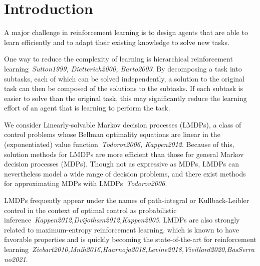 \section{Introduction}
A major challenge in reinforcement learning is to design agents that are able to learn efficiently and to adapt their existing knowledge to solve new tasks.

One way to reduce the complexity of learning is hierarchical reinforcement learning~\textit{Sutton1999, Dietterich2000, Barto2003}. By decomposing a task into subtasks, each of which can be solved independently, a solution to the original task can then be composed of the solutions to the subtasks. If each subtask is easier to solve than the original task, this may significantly reduce the learning effort of an agent that is learning to perform the task.

We consider Linearly-solvable Markov decision processes (LMDPs), a class of control problems %
whose Bellman optimality equations are linear in the (exponentiated) value function~\textit{Todorov2006, Kappen2012}. Because of this, solution methods for LMDPs are more efficient than those for general Markov decision processes (MDPs). 
Though not as expressive as MDPs, LMDPs can nevertheless model a wide range of decision problems, and there exist methods for approximating MDPs with LMDPs~\textit{Todorov2006}.

LMDPs frequently appear under the names of path-integral or Kullback-Leibler control in the context of optimal control as probabilistic inference~\textit{Kappen2012,Dvijotham2012,Kappen2005}. LMDPs are also strongly related to maximum-entropy reinforcement learning, which is known to have favorable properties and is quickly becoming the state-of-the-art for reinforcement learning~\textit{Ziebart2010,Mnih2016,Haarnoja2018,Levine2018,Vieillard2020,BasSerrano2021}.



